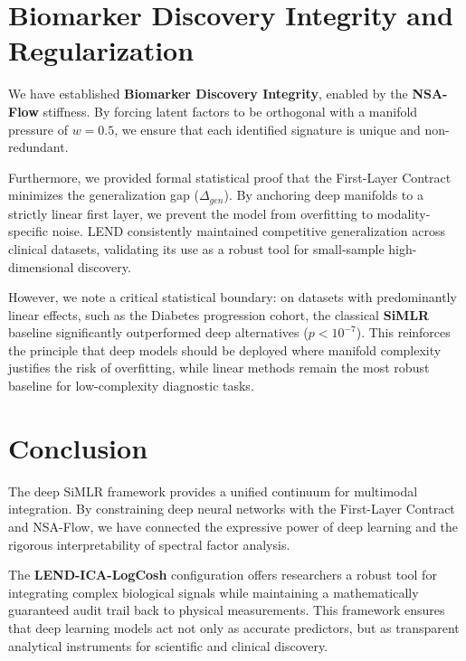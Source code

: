 \documentclass[
  letterpaper,
]{report}
\begin{document}
\section{Biomarker Discovery Integrity and
Regularization}\label{biomarker-discovery-integrity-and-regularization}

We have established \textbf{Biomarker Discovery Integrity}, enabled by
the \textbf{NSA-Flow} stiffness. By forcing latent factors to be
orthogonal with a manifold pressure of \(w=0.5\), we ensure that each
identified signature is unique and non-redundant.

Furthermore, we provided formal statistical proof that the First-Layer
Contract minimizes the generalization gap (\(\Delta_{gen}\)). By
anchoring deep manifolds to a strictly linear first layer, we prevent
the model from overfitting to modality-specific noise. LEND consistently
maintained competitive generalization across clinical datasets,
validating its use as a robust tool for small-sample high-dimensional
discovery.

However, we note a critical statistical boundary: on datasets with
predominantly linear effects, such as the Diabetes progression cohort,
the classical \textbf{SiMLR} baseline significantly outperformed deep
alternatives (\(p < 10^{-7}\)). This reinforces the principle that deep
models should be deployed where manifold complexity justifies the risk
of overfitting, while linear methods remain the most robust baseline for
low-complexity diagnostic tasks.

\section{Conclusion}\label{conclusion}

The deep SiMLR framework provides a unified continuum for multimodal
integration. By constraining deep neural networks with the First-Layer
Contract and NSA-Flow, we have connected the expressive power of deep
learning and the rigorous interpretability of spectral factor analysis.

The \textbf{LEND-ICA-LogCosh} configuration offers researchers a robust
tool for integrating complex biological signals while maintaining a
mathematically guaranteed audit trail back to physical measurements.
This framework ensures that deep learning models act not only as
accurate predictors, but as transparent analytical instruments for
scientific and clinical discovery.

\cleardoublepage
{}
{}
\appendix
\end{document}
